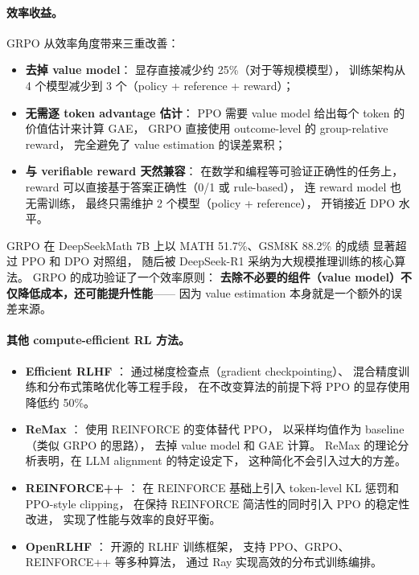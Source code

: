 \paragraph{效率收益。}
GRPO 从效率角度带来三重改善：
\begin{itemize}[leftmargin=2em]
  \item \textbf{去掉 value model}：
    显存直接减少约 25\%（对于等规模模型），
    训练架构从 4 个模型减少到 3 个（policy + reference + reward）；
  \item \textbf{无需逐 token advantage 估计}：
    PPO 需要 value model 给出每个 token 的价值估计来计算 GAE，
    GRPO 直接使用 outcome-level 的 group-relative reward，
    完全避免了 value estimation 的误差累积；
  \item \textbf{与 verifiable reward 天然兼容}：
    在数学和编程等可验证正确性的任务上，
    reward 可以直接基于答案正确性（0/1 或 rule-based），
    连 reward model 也无需训练，
    最终只需维护 2 个模型（policy + reference），
    开销接近 DPO 水平。
\end{itemize}

\noindent
GRPO 在 DeepSeekMath 7B 上以 MATH 51.7\%、GSM8K 88.2\% 的成绩
显著超过 PPO 和 DPO 对照组，
随后被 DeepSeek-R1 \cite{deepseek2025r1} 采纳为大规模推理训练的核心算法。
GRPO 的成功验证了一个效率原则：
\textbf{去除不必要的组件（value model）不仅降低成本，还可能提升性能}——
因为 value estimation 本身就是一个额外的误差来源。

\paragraph{其他 compute-efficient RL 方法。}
\begin{itemize}[leftmargin=2em]
  \item \textbf{Efficient RLHF} \cite{santacroce2023efficient}：
    通过梯度检查点（gradient checkpointing）、
    混合精度训练和分布式策略优化等工程手段，
    在不改变算法的前提下将 PPO 的显存使用降低约 50\%。

  \item \textbf{ReMax} \cite{li2023remax}：
    使用 REINFORCE 的变体替代 PPO，
    以采样均值作为 baseline（类似 GRPO 的思路），
    去掉 value model 和 GAE 计算。
    ReMax 的理论分析表明，在 LLM alignment 的特定设定下，
    这种简化不会引入过大的方差。

  \item \textbf{REINFORCE++} \cite{hu2025reinforcepp}：
    在 REINFORCE 基础上引入 token-level KL 惩罚和 PPO-style clipping，
    在保持 REINFORCE 简洁性的同时引入 PPO 的稳定性改进，
    实现了性能与效率的良好平衡。

  \item \textbf{OpenRLHF} \cite{hu2024openrlhf}：
    开源的 RLHF 训练框架，
    支持 PPO、GRPO、REINFORCE++ 等多种算法，
    通过 Ray 实现高效的分布式训练编排。
\end{itemize}

